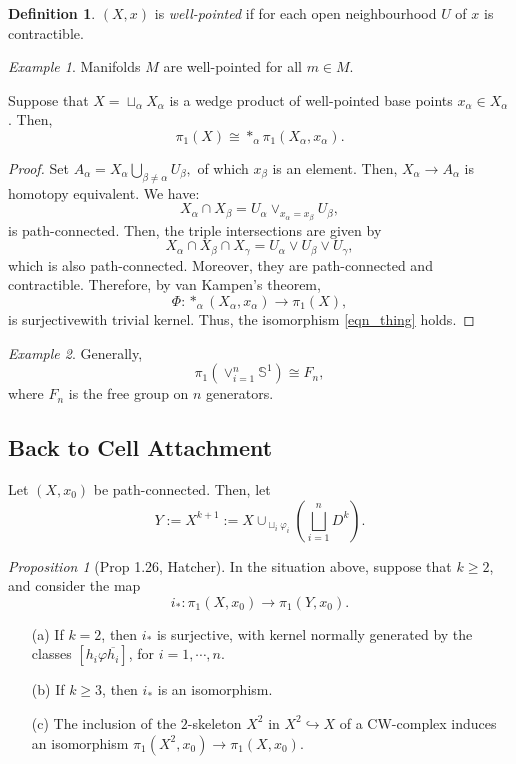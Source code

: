 \documentclass[a4paper]{report}
\theoremstyle{definition}
\newtheorem{definition}{Definition}
\theoremstyle{remark}
\theoremstyle{proposition}
\newtheorem{proposition}{Proposition}
\theoremstyle{conjecture}
\theoremstyle{lemma}
\theoremstyle{corollary}
\theoremstyle{exercise}
\newtheorem{example}{Example}
\begin{document}
\begin{definition}
    $(X,x)$ is \emph{well-pointed} if for each open neighbourhood $U$ of $x$
    is contractible.
\end{definition}

\begin{example}
    Manifolds $M$ are well-pointed for all $m \in M$.
\end{example} 
Suppose that $X = \sqcup_\alpha X_\alpha$ is a wedge product of well-pointed base points 
$x_\alpha \in X_\alpha$. Then, 
\begin{equation}\label{eqn_thing}
    \pi_1(X)  \cong \ast_\alpha \pi_1(X_\alpha, x_\alpha).
\end{equation}

\begin{proof}
    Set $A_\alpha = X_\alpha \bigcup_{\beta \neq \alpha} U_\beta,$
    of which $x_\beta$ is an element. Then,
    $X_\alpha \to A_\alpha$ is homotopy equivalent. We have:
    $$X_\alpha \cap X_\beta = U_\alpha \vee_{x_\alpha = x_\beta} U_\beta,$$
    is path-connected. Then, the triple intersections are given by
    $$X_\alpha \cap X_\beta \cap X_\gamma = U_\alpha \vee U_\beta \vee U_\gamma,$$
    which is also path-connected. Moreover, they are path-connected and contractible.
    Therefore, by van Kampen's theorem, 
    $$\Phi : \ast_\alpha (X_\alpha,x_\alpha) \longrightarrow \pi_1(X),$$
    is surjectivewith trivial kernel.
    Thus, the isomorphism \eqref{eqn_thing} holds.
\end{proof}

\begin{example}
    Generally, 
    $$\pi_1\left(\vee_{i=1}^n \mathbb{S}^1\right) \cong F_n,$$
    where $F_n$ is the free group on $n$ generators.
\end{example}

\subsection{Back to Cell Attachment}

Let $(X,x_0)$ be path-connected.
Then, let 
$$Y := X^{k+1} :=  X \cup_{\sqcup_i \varphi_i} \left(\bigsqcup_{i=1}^n D^k\right).$$

\begin{proposition}[Prop 1.26, Hatcher]
    In the situation above, suppose that $k\geq 2$,
    and consider the map
    $$i_\ast : \pi_1(X,x_0) \longrightarrow \pi_1(Y,x_0).$$
    \begin{itemize}
        \item[(a)] If $k = 2$, then $i_\ast$ is surjective, with kernel
        normally generated by the classes $[h_i\varphi \overline{h_i}]$,
        for $i=1,\cdots,n$.
    \item[(b)] If $k \geq 3$, then $i_\ast$ is an isomorphism.
    \item[(c)] The inclusion of the $2$-skeleton $X^2$ in 
        $X^2 \hookrightarrow X$ of a 
        CW-complex induces an isomorphism $\pi_1(X^2,x_0) \to \pi_1(X,x_0)$.
\end{itemize}
\end{proposition}
\end{document}
